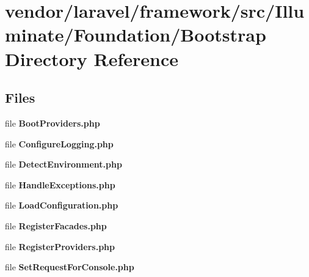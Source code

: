 \section{vendor/laravel/framework/src/\+Illuminate/\+Foundation/\+Bootstrap Directory Reference}
\label{dir_c9c30642dbfd8683be104c904e82a07d}
\subsection*{Files}
\begin{DoxyCompactItemize}
\item 
file {\bf Boot\+Providers.\+php}
\item 
file {\bf Configure\+Logging.\+php}
\item 
file {\bf Detect\+Environment.\+php}
\item 
file {\bf Handle\+Exceptions.\+php}
\item 
file {\bf Load\+Configuration.\+php}
\item 
file {\bf Register\+Facades.\+php}
\item 
file {\bf Register\+Providers.\+php}
\item 
file {\bf Set\+Request\+For\+Console.\+php}
\end{DoxyCompactItemize}
